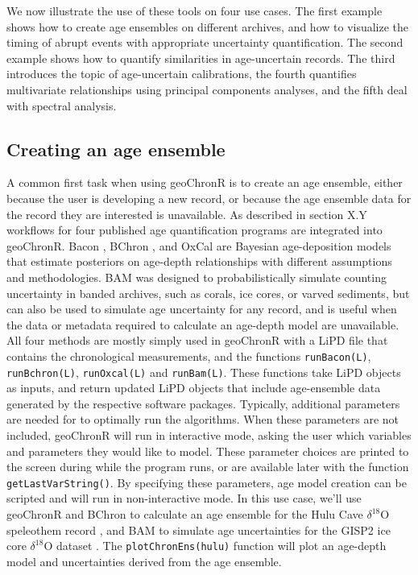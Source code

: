 \documentclass[gc, manuscript]{copernicus}
\begin{document}
We now illustrate the use of these tools on four use cases. The first
example shows how to create age ensembles on different archives, and how
to visualize the timing of abrupt events with appropriate uncertainty
quantification. The second example shows how to quantify similarities in
age-uncertain records. The third introduces the topic of age-uncertain
calibrations, the fourth quantifies multivariate relationships using
principal components analyses, and the fifth deal with spectral
analysis.

\subsection{Creating an age ensemble}

A common first task when using geoChronR is to create an age ensemble,
either because the user is developing a new record, or because the age
ensemble data for the record they are interested is unavailable. As
described in section X.Y workflows for four published age quantification
programs are integrated into geoChronR. Bacon \citep{bacon}, BChron
\citep{parnell2008flexible}, and OxCal \citep{ramsey2008deposition} are
Bayesian age-deposition models that estimate posteriors on age-depth
relationships with different assumptions and methodologies. BAM
\citep{BAM} was designed to probabilistically simulate counting
uncertainty in banded archives, such as corals, ice cores, or varved
sediments, but can also be used to simulate age uncertainty for any
record, and is useful when the data or metadata required to calculate an
age-depth model are unavailable. All four methods are mostly simply used
in geoChronR with a LiPD file that contains the chronological
measurements, and the functions \texttt{runBacon(L)},
\texttt{runBchron(L)}, \texttt{runOxcal(L)} and \texttt{runBam(L)}.
These functions take LiPD objects as inputs, and return updated LiPD
objects that include age-ensemble data generated by the respective
software packages. Typically, additional parameters are needed for to
optimally run the algorithms. When these parameters are not included,
geoChronR will run in interactive mode, asking the user which variables
and parameters they would like to model. These parameter choices are
printed to the screen during while the program runs, or are available
later with the function \texttt{getLastVarString()}. By specifying these
parameters, age model creation can be scripted and will run in
non-interactive mode. In this use case, we'll use geoChronR and BChron
\citep{parnell2008flexible} to calculate an age ensemble for the Hulu
Cave \(\delta^{18}\)O speleothem record \citep{hulu2001}, and BAM
\citep{BAM} to simulate age uncertainties for the GISP2 ice core
\(\delta^{18}\)O dataset \citep{alley}. The \texttt{plotChronEns(hulu)}
function will plot an age-depth model and uncertainties derived from the
age ensemble.
\end{document}

